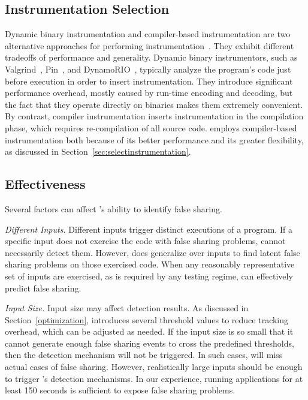 \label{sec:discussion}

\subsection{Instrumentation Selection}
\label{sec:instrumentationtradeoff}
Dynamic binary instrumentation and compiler-based instrumentation are two alternative approaches for performing instrumentation~\cite{Instrumentation}. They exhibit different tradeoffs of performance and generality. Dynamic binary instrumentors, such as Valgrind~\cite{Valgrind}, Pin~\cite{Pin}, and DynamoRIO~\cite{DynamoRIO}, typically analyze the program's code just before execution in order to insert instrumentation. They introduce significant performance overhead, mostly caused by run-time encoding and decoding, but the fact that they operate directly on binaries makes them extremely convenient. By contrast, compiler instrumentation inserts instrumentation in the compilation phase, which requires re-compilation of all source code. 
\Predator{} employs compiler-based instrumentation both because of its better performance and its greater flexibility, as discussed in Section~\ref{sec:selectinstrumentation}.

\subsection{Effectiveness}
Several factors can affect \Predator{}'s ability to identify false sharing.


\emph{Different Inputs.} Different inputs trigger distinct executions of a program. If a specific input does not exercise the code with false sharing problems, \Predator{} cannot necessarily detect them. However, \Predator{} does generalize over inputs to find latent false sharing problems on those exercised code. When any reasonably representative set of inputs are exercised, as is required by any testing regime, \Predator{} can effectively predict false sharing.

\emph{Input Size.} Input size may affect detection results.  As discussed in Section~\ref{optimization}, \Predator{} introduces several threshold values to reduce tracking overhead, which can be adjusted as needed. If the input size is so small that it cannot generate enough false sharing events to cross the predefined thresholds, then the detection mechanism will not be triggered. In such cases, \Predator{} will miss actual cases of false sharing. However, realistically large inputs should be enough to trigger \Predator{}'s detection mechanisms. In our experience, running applications for at least 150 seconds is sufficient to expose false sharing problems. 

